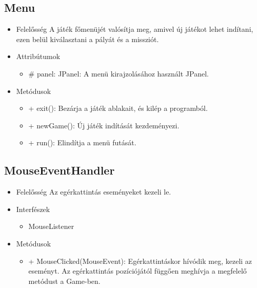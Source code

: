 \subsection{Menu}
\begin{itemize}
\item Felelősség \newline
A játék főmenüjét valósítja meg, amivel új játékot lehet indítani, ezen belül kiválasztani a pályát és a missziót.
\item Attribútumok
	\begin{itemize}
		\item \# panel: JPanel: A menü kirajzolásához használt JPanel.
	\end{itemize}
\item Metódusok
	\begin{itemize}
		\item + exit(): Bezárja a játék ablakait, és kilép a programból.
		\item + newGame(): Új játék indítását kezdeményezi.
		\item + run(): Elindítja a menü futását.
	\end{itemize}
\end{itemize}

\subsection{MouseEventHandler}
\begin{itemize}
\item Felelősség  \newline
Az egérkattintás eseményeket kezeli le.
\item Interfészek
\begin{itemize}
	\item MouseListener
\end{itemize}
\item Metódusok
	\begin{itemize}
		\item + MouseClicked(MouseEvent): Egérkattintáskor hívódik meg, kezeli az eseményt. Az egérkattintás pozíciójától függően meghívja a megfelelő metódust a Game-ben.
	\end{itemize}
\end{itemize}

